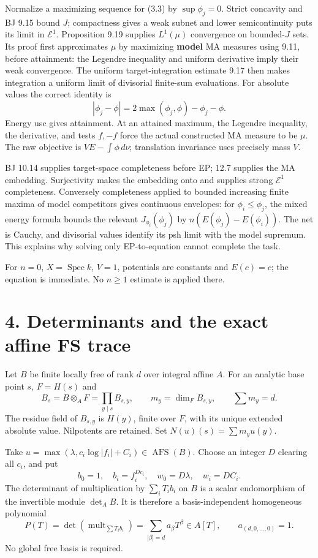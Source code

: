 \documentclass[
  10pt,
]{article}
\begin{document}
Normalize a maximizing sequence for (3.3) by \(\sup\phi_j=0\). Strict
concavity and BJ 9.15 bound \(J\); compactness gives a weak subnet and
lower semicontinuity puts its limit in \(\mathcal E^1\). Proposition
9.19 supplies \(L^1(\mu)\) convergence on bounded-\(J\) sets. Its proof
first approximates \(\mu\) by maximizing \textbf{model} MA measures
using 9.11, before attainment: the Legendre inequality and uniform
derivative imply their weak convergence. The uniform target-integration
estimate 9.17 then makes integration a uniform limit of divisorial
finite-sum evaluations. For absolute values the correct identity is
\[|\phi_j-\phi|=2\max(\phi_j,\phi)-\phi_j-\phi.\] Energy usc gives
attainment. At an attained maximum, the Legendre inequality, the
derivative, and tests \(f,-f\) force the actual constructed MA measure
to be \(\mu\). The raw objective is \(VE-\int\phi\,d\nu\); translation
invariance uses precisely mass \(V\).

BJ 10.14 supplies target-space completeness before EP; 12.7 supplies the
MA embedding. Surjectivity makes the embedding onto and supplies strong
\(\mathcal E^1\) completeness. Conversely completeness applied to
bounded increasing finite maxima of model competitors gives continuous
envelopes: for \(\phi_i\le\phi_j\), the mixed energy formula bounds the
relevant \(J_{\phi_i}(\phi_j)\) by \(n(E(\phi_j)-E(\phi_i))\). The net
is Cauchy, and divisorial values identify its psh limit with the model
supremum. This explains why solving only EP-to-equation cannot complete
the task.

For \(n=0\), \(X=\operatorname{Spec}k\), \(V=1\), potentials are
constants and \(E(c)=c\); the equation is immediate. No \(n\ge1\)
estimate is applied there.

\section{4. Determinants and the exact affine FS
trace}\label{determinants-and-the-exact-affine-fs-trace}

Let \(B\) be finite locally free of rank \(d\) over integral affine
\(A\). For an analytic base point \(s\), \(F=H(s)\) and
\[B_s=B\otimes_A F=\prod_{y\mid s}B_{s,y},\qquad
 m_y=\dim_F B_{s,y},\qquad \sum m_y=d.\] The residue field of
\(B_{s,y}\) is \(H(y)\), finite over \(F\), with its unique extended
absolute value. Nilpotents are retained. Set \(N(u)(s)=\sum m_yu(y)\).

Take \(u=\max(\lambda,c_i\log|f_i|+C_i)\in\operatorname{AFS}(B)\).
Choose an integer \(D\) clearing all \(c_i\), and put
\[b_0=1,\quad b_i=f_i^{Dc_i},\quad w_0=D\lambda,\quad w_i=DC_i.\] The
determinant of multiplication by \(\sum_iT_i b_i\) on \(B\) is a scalar
endomorphism of the invertible module \(\det_A B\). It is therefore a
basis-independent homogeneous polynomial
\[P(T)=\det(\operatorname{mult}_{\sum T_i b_i})
       =\sum_{|\beta|=d}a_\beta T^\beta\in A[T],\qquad a_{(d,0,\ldots,0)}=1.\]
No global free basis is required.
\end{document}
